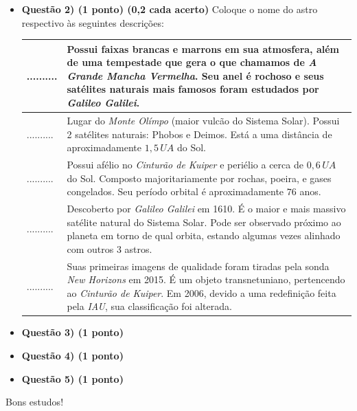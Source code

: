 \documentclass[a4paper, 12pt]{article}
\begin{document}
\begin{itemize}
		\item \textbf{Questão 2) (1 ponto) (0,2 cada acerto)} Coloque o nome do astro respectivo às seguintes descrições:
			\begin{center} \begin{tabular}{|M{0.2\textwidth}|M{0.65\textwidth}|}
				\hline
				.......... & Possui faixas brancas e marrons em sua atmosfera, além de uma tempestade que gera o que chamamos de \textit{A Grande Mancha Vermelha}. Seu anel é rochoso e seus satélites naturais mais famosos foram estudados por \textit{Galileo Galilei}. \\ \hline
				.......... & Lugar do \textit{Monte Olímpo} (maior vulcão do Sistema Solar). Possui 2 satélites naturais: Phobos e Deimos. Está a uma distância de aproximadamente $1,5 \, UA$ do Sol. \\ \hline
				.......... & Possui afélio no \textit{Cinturão de Kuiper} e periélio a cerca de $0,6 \, UA$ do Sol. Composto majoritariamente por rochas, poeira, e gases congelados. Seu período orbital é aproximadamente $76$ anos. \\ \hline
				.......... & Descoberto por \textit{Galileo Galilei} em 1610. É o maior e mais massivo satélite natural do Sistema Solar. Pode ser observado próximo ao planeta em torno de qual orbita, estando algumas vezes alinhado com outros 3 astros.  \\ \hline
				.......... & Suas primeiras imagens de qualidade foram tiradas pela sonda \textit{New Horizons} em 2015. É um objeto transnetuniano, pertencendo ao \textit{Cinturão de Kuiper}. Em 2006, devido a uma redefinição feita pela \textit{IAU}, sua classificação foi alterada. \\ \hline
			\end{tabular} \end{center}
		
		\item \textbf{Questão 3) (1 ponto)} 
			
		\item \textbf{Questão 4) (1 ponto)} 
				
		\item \textbf{Questão 5) (1 ponto)} 
			
	\end{itemize}

	\begin{flushright}
		\begin{large}
			Bons estudos!
		\end{large}
	\end{flushright}
\end{document}
